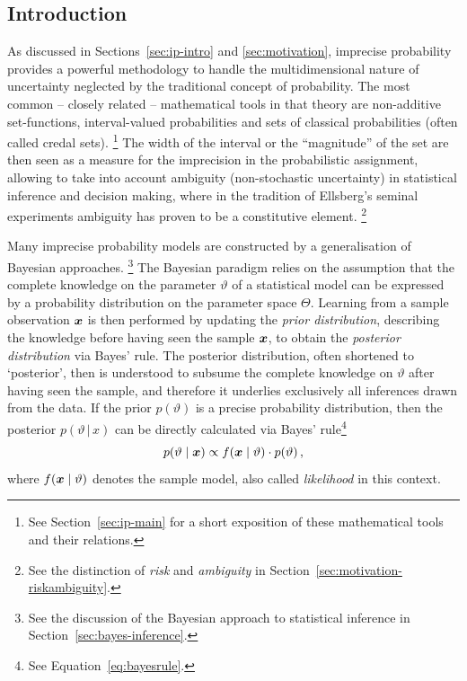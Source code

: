 \subsection{Introduction}
\label{sec:jstp-intro}

As discussed in Sections~\ref{sec:ip-intro} and \ref{sec:motivation},
imprecise probability %
provides a powerful methodology to handle the multidimensional
nature of uncertainty %
neglected by the traditional concept of probability. The most common
-- closely related -- mathematical tools in that theory are
non-additive set-functions, interval-valued probabilities and sets
of classical probabilities (often called credal sets).%
\footnote{See Section~\ref{sec:ip-main} for a short exposition of these mathematical tools and their relations.}
The width of the interval or the ``magnitude'' of the set are then seen as a
measure for the imprecision in the probabilistic assignment,
allowing to take into account ambiguity (non-stochastic uncertainty)
in statistical inference and decision making, where in the
tradition of Ellsberg's \parencite*{1961:ellsberg} seminal
experiments ambiguity has proven to be a constitutive element.%
\footnote{See the distinction of \emph{risk} and \emph{ambiguity} in Section~\ref{sec:motivation-riskambiguity}.}

Many imprecise probability models are constructed by a
generalisation of Bayes\-ian approaches.%
\footnote{See the discussion of the Bayesian approach to statistical inference in
Section~\ref{sec:bayes-inference}.}
The Bayesian paradigm
relies on the assumption that the complete knowledge on the
parameter $\vartheta$ of a statistical model can be expressed by a
probability distribution on the parameter space $\Theta$. Learning
from a sample observation ${\bm x}$ is then performed by updating the
\emph{prior distribution}, describing the knowledge before having
seen the sample ${\bm x}$, to obtain the \emph{posterior distribution} via
Bayes' rule. The posterior distribution, often shortened to
`posterior', then is understood to subsume the complete
knowledge on $\vartheta$ after having seen the sample, and therefore
it underlies exclusively all inferences drawn from the data. If the
prior $p(\vartheta)$ is a precise probability distribution, then the
posterior $p(\vartheta\,|\,x)$ can be directly calculated via Bayes'
rule\footnote{See Equation~\eqref{eq:bayesrule}.} %
\begin{equation*}%
p(\vartheta\mid\x) \propto f(\x\mid\vartheta) \cdot p(\vartheta)\,,%
\end{equation*}
where $f({\bm x}\mid\vartheta)$ denotes the sample model, also called
\emph{likelihood} in this context.

